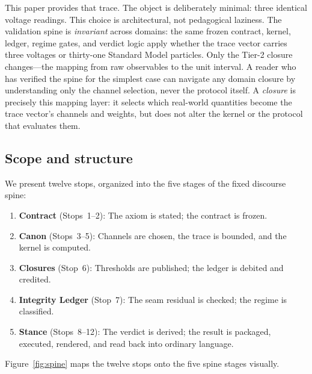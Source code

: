 \documentclass[
  aps,
  prd,
  twocolumn,
  superscriptaddress,
  nofootinbib,
  floatfix
]{revtex4-2}
\begin{document}
This paper provides that trace.  The object is deliberately
minimal: three identical voltage readings.  This choice is
architectural, not pedagogical laziness.  The validation spine is
\emph{invariant} across domains: the same frozen contract, kernel,
ledger, regime gates, and verdict logic apply whether the trace
vector carries three voltages or thirty-one Standard Model
particles.  Only the Tier-2 closure changes---the mapping from raw
observables to the unit interval.  A reader who has verified the
spine for the simplest case can navigate any domain closure by
understanding only the channel selection, never the protocol itself.
A \emph{closure} is precisely this mapping layer: it selects which
real-world quantities become the trace vector's channels and weights,
but does not alter the kernel or the protocol that evaluates them.

\subsection{Scope and structure}

We present twelve stops, organized into the five stages of the
fixed discourse spine:
\begin{enumerate}[leftmargin=*]
\item \textbf{Contract} (Stops~1--2): The axiom is stated; the
  contract is frozen.
\item \textbf{Canon} (Stops~3--5): Channels are chosen, the trace
  is bounded, and the kernel is computed.
\item \textbf{Closures} (Stop~6): Thresholds are published; the
  ledger is debited and credited.
\item \textbf{Integrity Ledger} (Stop~7): The seam residual is
  checked; the regime is classified.
\item \textbf{Stance} (Stops~8--12): The verdict is derived;
  the result is packaged, executed, rendered, and read back into
  ordinary language.
\end{enumerate}

Figure~\ref{fig:spine} maps the twelve stops onto the five spine
stages visually.
\end{document}
